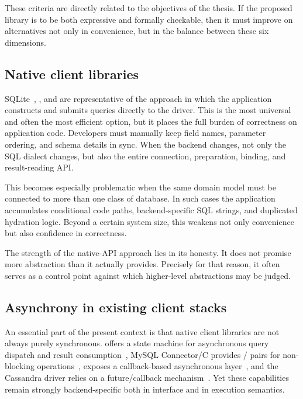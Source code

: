 These criteria are directly related to the objectives of the thesis. If the proposed library is to be both expressive and formally checkable, then it must improve on alternatives not only in convenience, but in the balance between these six dimensions.

\subsection{Native client libraries}

SQLite~\cite{sqlite}, , and  are representative of the approach in which the application constructs and submits queries directly to the driver. This is the most universal and often the most efficient option, but it places the full burden of correctness on application code. Developers must manually keep field names, parameter ordering, and schema details in sync. When the backend changes, not only the SQL dialect changes, but also the entire connection, preparation, binding, and result-reading API.

This becomes especially problematic when the same domain model must be connected to more than one class of database. In such cases the application accumulates conditional code paths, backend-specific SQL strings, and duplicated hydration logic. Beyond a certain system size, this weakens not only convenience but also confidence in correctness.

The strength of the native-API approach lies in its honesty. It does not promise more abstraction than it actually provides. Precisely for that reason, it often serves as a control point against which higher-level abstractions may be judged.

\subsection{Asynchrony in existing client stacks}

An essential part of the present context is that native client libraries are not always purely synchronous.  offers a state machine for asynchronous query dispatch and result consumption~\cite{libpq_async}, MySQL Connector/C provides / pairs for non-blocking operations~\cite{mysql_capi_async},  exposes a callback-based asynchronous layer~\cite{hiredis}, and the Cassandra driver relies on a future/callback mechanism~\cite{cassandra_futures}. Yet these capabilities remain strongly backend-specific both in interface and in execution semantics.

